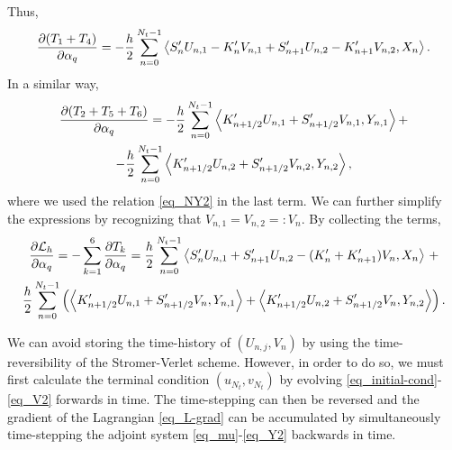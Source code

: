 \documentclass[11pt]{article}
\begin{document}
Thus,
\begin{equation}
  \frac{\partial (T_1 + T_4)}{\partial \alpha_q} = - \frac{h}{2} \sum_{n=0}^{N_t-1} \left\langle S'_nU_{n,1} - K'_nV_{n,1} + S'_{n+1}U_{n,2} -
  K'_{n+1}V_{n,2}, X_{n} \right\rangle.
\end{equation}
In a similar way,
\begin{multline}
  \frac{\partial (T_2 + T_5 + T_6)}{\partial \alpha_q} = - \frac{h}{2} \sum_{n=0}^{N_t-1} \left\langle
  K'_{n+1/2} U_{n,1} + S'_{n+1/2} V_{n,1}, Y_{n,1}\right\rangle + \\ 
  - \frac{h}{2} \sum_{n=0}^{N_t-1} \left\langle K'_{n+1/2} U_{n,2} + S'_{n+1/2} V_{n,2},Y_{n,2} \right\rangle,
\end{multline}
where we used the relation \eqref{eq_NY2} in the last term. We can further simplify the expressions
by recognizing that $V_{n,1}=V_{n,2} =: V_n$. By collecting the terms,
\begin{multline}\label{eq_L-grad}
  \frac{\p{\cal L}_h}{\p \alpha_q} = - \sum_{k=1}^6 \frac{\p T_k}{\p \alpha_q} = 
%
  \frac{h}{2} \sum_{n=0}^{N_t-1} \left\langle S'_nU_{n,1} + S'_{n+1}U_{n,2} - (K'_n + K'_{n+1}) V_{n}, X_{n}
  \right\rangle\, + \\
  \frac{h}{2} \sum_{n=0}^{N_t-1} \left( \left\langle K'_{n+1/2} U_{n,1} + S'_{n+1/2} V_{n},
  Y_{n,1}\right\rangle +  \left\langle K'_{n+1/2} U_{n,2} + S'_{n+1/2} V_{n},Y_{n,2} \right\rangle \right).
\end{multline}

We can avoid storing the time-history of $(U_{n,j}, V_n)$ by using the time-reversibility of the
Stromer-Verlet scheme. However, in order to do so, we must first calculate the terminal condition
$(u_{N_t},v_{N_t})$ by evolving \eqref{eq_initial-cond}-\eqref{eq_V2} forwards in time. The
time-stepping can then be reversed and the gradient of the Lagrangian \eqref{eq_L-grad} can be
accumulated by simultaneously time-stepping the adjoint system \eqref{eq_mu}-\eqref{eq_Y2} backwards
in time.



\end{document}
